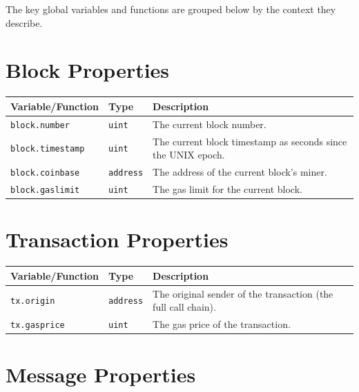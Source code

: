 \documentclass{scrbook}
\begin{document}
The key global variables and functions are grouped below by the context they describe.

\section{Block Properties}

\begin{table}[h!]
    \centering
    \begin{tabular}{|p{}|p{}|p{}|}
        \hline
        Variable/Function & Type & Description \\ \hline
        \texttt{block.number} & \texttt{uint} & The current block number. \\ \hline
        \texttt{block.timestamp} & \texttt{uint} & The current block timestamp as seconds since the UNIX epoch. \\ \hline
        \texttt{block.coinbase} & \texttt{address} & The address of the current block's miner. \\ \hline
        \texttt{block.gaslimit} & \texttt{uint} & The gas limit for the current block. \\ \hline
    \end{tabular}
\end{table}

\section{Transaction Properties}

\begin{table}[h!]
    \centering
    \begin{tabular}{|p{}|p{}|p{}|}
        \hline
        Variable/Function & Type & Description \\ \hline
        \texttt{tx.origin} & \texttt{address} & The original sender of the transaction (the full call chain). \\ \hline
        \texttt{tx.gasprice} & \texttt{uint} & The gas price of the transaction. \\ \hline
    \end{tabular}
\end{table}

\newpage

\section{Message Properties}
\end{document}
